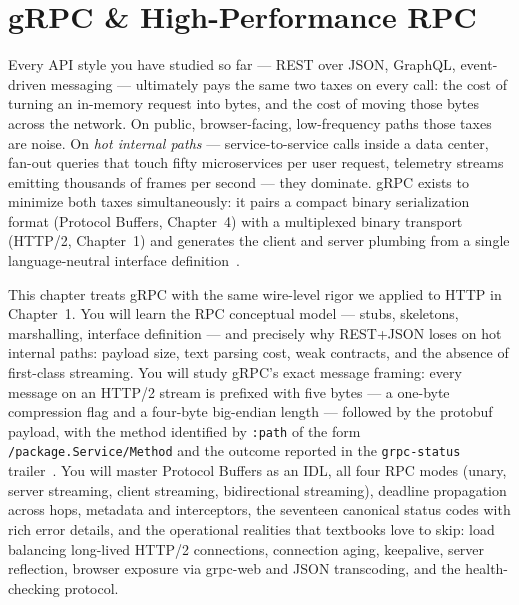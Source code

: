 \chapter{gRPC \& High-Performance RPC}
\label{ch:grpc}

Every API style you have studied so far --- REST over JSON, GraphQL, event-driven
messaging --- ultimately pays the same two taxes on every call: the cost of turning
an in-memory request into bytes, and the cost of moving those bytes across the
network. On public, browser-facing, low-frequency paths those taxes are noise. On
\emph{hot internal paths} --- service-to-service calls inside a data center,
fan-out queries that touch fifty microservices per user request, telemetry streams
emitting thousands of frames per second --- they dominate. gRPC exists to minimize
both taxes simultaneously: it pairs a compact binary serialization format
(Protocol Buffers, Chapter~4) with a multiplexed binary transport (HTTP/2,
Chapter~1) and generates the client and server plumbing from a single
language-neutral interface definition~\cite{grpcdocs,protobufdocs}.

This chapter treats gRPC with the same wire-level rigor we applied to HTTP in
Chapter~1. You will learn the RPC conceptual model --- stubs, skeletons,
marshalling, interface definition --- and precisely why REST+JSON loses on hot
internal paths: payload size, text parsing cost, weak contracts, and the absence
of first-class streaming. You will study gRPC's exact message framing: every
message on an HTTP/2 stream is prefixed with five bytes --- a one-byte compression
flag and a four-byte big-endian length --- followed by the protobuf payload, with
the method identified by \texttt{:path} of the form
\texttt{/package.Service/Method} and the outcome reported in the
\texttt{grpc-status} trailer~\cite{rfc9113,grpcdocs}. You will master Protocol
Buffers as an IDL, all four RPC modes (unary, server streaming, client streaming,
bidirectional streaming), deadline propagation across hops, metadata and
interceptors, the seventeen canonical status codes with rich error details, and
the operational realities that textbooks love to skip: load balancing long-lived
HTTP/2 connections, connection aging, keepalive, server reflection, browser
exposure via grpc-web and JSON transcoding, and the health-checking protocol.

